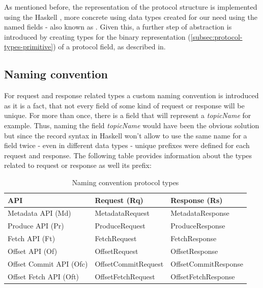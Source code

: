 As mentioned before, the representation of the protocol structure is implemented
using the Haskell , more
concrete using data types created for our need using the named fields - also
known as . Given this, a
further step of abstraction is introduced by creating types for the binary
representation (\ref{subsec:protocol-types-primitive}) of a protocol field, as
described in.

\subsection{Naming convention}

For request and response related types a custom naming convention is introduced
as it is a fact, that not every field of some kind of request or response will
be unique. For more than once, there is a field that will represent a
\textit{topicName} for example. Thus, naming the field \textit{topicName} would
have been the obvious solution but since the record syntax in Haskell won't
allow to use the same name for a field twice - even in different data types -
unique prefixes were defined for each request and response. The following table
provides information about the types related to request or response as well its
prefix:

\begin{table}[H]
\centering
\begin{tabular}{|l|l|l|}
\hline
\textbf{API}            & \textbf{Request (Rq)} & \textbf{Response (Rs)} \\ \hline
Metadata API (Md)       & MetadataRequest       & MetadataResponse       \\ \hline
Produce API (Pr)        & ProduceRequest        & ProduceResponse        \\ \hline
Fetch API (Ft)          & FetchRequest          & FetchResponse          \\ \hline
Offset API (Of)         & OffsetRequest         & OffsetResponse         \\ \hline
Offset Commit API (Ofc) & OffsetCommitRequest   & OffsetCommitResponse   \\ \hline
Offset Fetch API (Oft)  & OffsetFetchRequest    & OffsetFetchResponse    \\ \hline
\end{tabular}
\caption{Naming convention protocol types}
\end{table}

